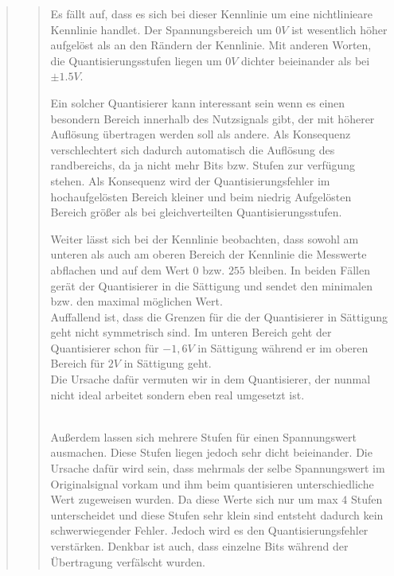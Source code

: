 \begin{quote}
\begin{quote}
        Es fällt auf, dass es sich bei dieser Kennlinie um eine nichtlinieare Kennlinie handlet. Der Spannungsbereich um
        $0V$ ist wesentlich höher aufgelöst als an den Rändern der Kennlinie. Mit anderen Worten, die
        Quantisierungsstufen liegen um $0V$ dichter beieinander als bei $\pm 1.5V$.\vspace{1em}
        
        Ein solcher Quantisierer kann interessant sein wenn es einen besondern Bereich innerhalb des Nutzsignals gibt,
        der mit höherer Auflösung übertragen werden soll als andere. Als Konsequenz verschlechtert sich dadurch
        automatisch die Auflösung des randbereichs, da ja nicht mehr Bits bzw. Stufen zur verfügung
        stehen. Als Konsequenz wird der Quantisierungsfehler im hochaufgelösten Bereich kleiner und beim
        niedrig Aufgelösten Bereich größer als bei gleichverteilten Quantisierungsstufen.\vspace{1em}
        
        Weiter lässt sich bei der Kennlinie beobachten, dass sowohl am unteren als auch am oberen Bereich der
        Kennlinie die Messwerte abflachen und auf dem Wert $0$ bzw. $255$ bleiben. In beiden Fällen gerät der
        Quantisierer in die Sättigung und sendet den minimalen bzw. den maximal möglichen Wert.\\
        Auffallend ist, dass die Grenzen für die der Quantisierer in Sättigung geht nicht symmetrisch sind. Im unteren
        Bereich geht der Quantisierer schon für $-1,6 V$ in Sättigung während er im oberen Bereich für $2 V$ in
        Sättigung geht.\\
        Die Ursache dafür vermuten wir in dem Quantisierer, der nunmal nicht ideal arbeitet sondern eben real umgesetzt
        ist.\vspace{1em}
        
        \\
        
        Außerdem lassen sich mehrere Stufen für einen Spannungswert ausmachen. Diese Stufen liegen jedoch sehr dicht
        beieinander. Die Ursache dafür wird sein, dass mehrmals der selbe Spannungswert im Originalsignal vorkam und
        ihm beim quantisieren unterschiedliche Wert zugeweisen wurden. Da diese Werte sich nur um max $4$ Stufen
        unterscheidet und diese Stufen sehr klein sind entsteht dadurch kein schwerwiegender Fehler. Jedoch wird es den
        Quantisierungsfehler verstärken. Denkbar ist auch, dass einzelne Bits während der Übertragung verfälscht
        wurden.\vspace{1em}
        

\end{quote}
\end{quote}
